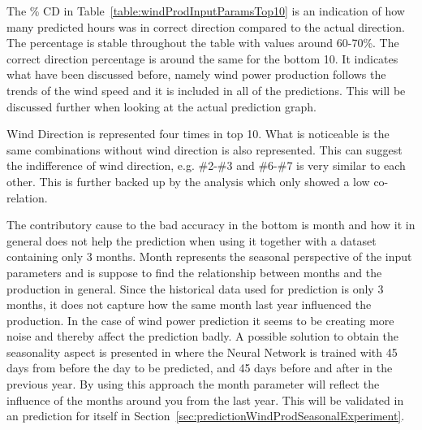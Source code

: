 The \% CD in Table~\ref{table:windProdInputParamsTop10} is an indication of how many predicted hours was in correct direction compared to the actual direction. The percentage is stable throughout the table with values around 60-70\%. The correct direction percentage is around the same for the bottom 10. It indicates what have been discussed before, namely wind power production follows the trends of the wind speed and it is included in all of the predictions. This will be discussed further when looking at the actual prediction graph.

Wind Direction is represented four times in top 10. What is noticeable is the same combinations without wind direction is also represented. This can suggest the indifference of wind direction, e.g. \#2-\#3 and \#6-\#7 is very similar to each other. This is further backed up by the analysis which only showed a low co-relation.

The contributory cause to the bad accuracy in the bottom is month and how it in general does not help the prediction when using it together with a dataset containing only 3 months. Month represents the seasonal perspective of the input parameters and is suppose to find the relationship between months and the production in general. Since the historical data used for prediction is only 3 months, it does not capture how the same month last year influenced the production. In the case of wind power prediction it seems to be creating more noise and thereby affect the prediction badly. A possible solution to obtain the seasonality aspect is presented in\cite{pjmForecast} where the Neural Network is trained with 45 days from before the day to be predicted, and 45 days before and after in the previous year. By using this approach the month parameter will reflect the influence of the months around you from the last year. This will be validated in an prediction for itself in Section~\ref{sec:predictionWindProdSeasonalExperiment}.

